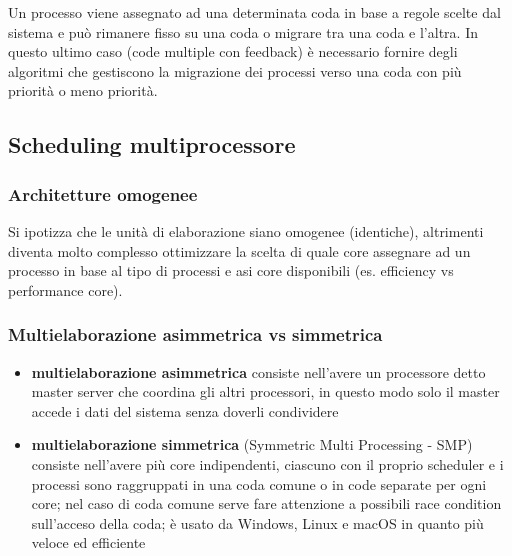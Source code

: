\documentclass[a4paper]{article}
\begin{document}
Un processo viene assegnato ad una determinata coda in base a regole scelte dal sistema e può rimanere fisso su una coda o migrare
tra una coda e l'altra. In questo ultimo caso (code multiple con feedback) è necessario fornire degli algoritmi che gestiscono
la migrazione dei processi verso una coda con più priorità o meno priorità.


\subsection{Scheduling multiprocessore}
\subsubsection*{Architetture omogenee}
Si ipotizza che le unità di elaborazione siano omogenee (identiche), altrimenti diventa molto complesso ottimizzare la scelta
di quale core assegnare ad un processo in base al tipo di processi e asi core disponibili (es. efficiency vs performance core).

\subsubsection*{Multielaborazione asimmetrica vs simmetrica}
\begin{itemize}
	\item \textbf{multielaborazione asimmetrica} consiste nell'avere un processore detto master server che coordina gli altri
	processori, in questo modo solo il master accede i dati del sistema senza doverli condividere
	\item \textbf{multielaborazione simmetrica} (Symmetric Multi Processing - SMP) consiste nell'avere più core indipendenti,
	ciascuno con il proprio scheduler e i processi sono raggruppati in una coda comune o in code separate per ogni core; nel caso
	di coda comune serve fare attenzione a possibili race condition sull'acceso della coda; è usato da Windows, Linux e macOS
	in quanto più veloce ed efficiente
\end{itemize}
\end{document}
